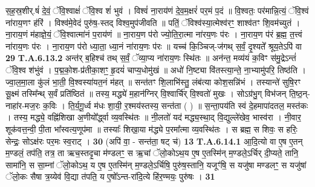 \documentclass[17pt]{extarticle}
\begin{document}
                  स॒ह॒स्र॒शीर्.षं॑ दे॒वं॒ ॅवि॒श्वाक्षं॑ ॅवि॒श्व शं॑ भुवं । विश्वं॑ ना॒राय॑णं दे॒व॒म॒क्षरं॑ पर॒मं प॒दं ॥  वि॒श्वतः॒ पर॑मान्नि॒त्यं॒ ॅवि॒श्वं ना॑राय॒णꣳ ह॑रिं । विश्व॑मे॒वेदं पुरु॑ष॒-स्तद् विश्व॒मुप॑जीवति ॥  पतिं॒ ॅविश्व॑स्या॒त्मेश्व॑रꣳ॒॒ शाश्व॑तꣳ शि॒वम॑च्युतं । ना॒राय॒णं म॑हाज्ञे॒यं॒ ॅवि॒श्वात्मा॑नं प॒राय॑णं ॥  ना॒राय॒ण प॑रो ज्यो॒ति॒रा॒त्मा ना॑रय॒णः प॑रः ।  ना॒राय॒ण प॑रं ब्र॒ह्म॒ त॒त्त्वं ना॑राय॒णः प॑रः । ना॒राय॒ण प॑रो ध्या॒ता॒ ध्या॒नं ना॑राय॒णः प॑रः ॥ यच्च॑ कि॒ञ्चिज्-ज॑गथ् स॒र्वं॒ दृ॒श्यते᳚ श्रूय॒तेऽपि॑ वा \textbf{ 29} \newline
                  \newline
                                                                  \textbf{ T.A.6.13.2} \newline
                  अन्त॑र् ब॒हिश्च॑ तथ् स॒र्वं॒ ॅव्या॒प्य ना॑राय॒णः स्थि॑तः ॥  अन॑न्त॒ मव्य॑यं क॒विꣳ स॑मु॒द्रेऽन्तं॑ ॅवि॒श्व श॑भुंवं । प॒द्म॒को॒श-प्र॑तीका॒शꣳ॒॒ हृ॒दयं॑ चाप्य॒धोमु॑खं ॥  अधो॑ नि॒ष्ट्या वि॑तस्त्या॒न्ते॒ ना॒भ्यामु॑परि॒ तिष्ठ॑ति ।  ज्वा॒ल॒मा॒ला कु॑लं भा॒ती॒ वि॒श्वस्या॑यत॒नं म॑हत् ॥  सन्त॑तꣳ शि॒लाभि॑स्तु॒ लंब॑त्या कोश॒सन्नि॑भं ।  तस्यान्ते॑ सुषि॒रꣳ सू॒क्ष्मं तस्मि᳚न्थ् स॒र्वं प्रति॑ष्ठितं ॥  तस्य॒ मद्ध्ये॑ म॒हान॑ग्निर् वि॒श्वार्चि॑र् वि॒श्वतो॑ मुखः । सोऽग्र॑भु॒ग् विभ॑जन् ति॒ष्ठ॒न्-नाहा॑र-मज॒रः क॒विः । ति॒र्य॒गू॒र्ध्व म॑धः शा॒यी॒ र॒श्मय॑स्तस्य॒ सन्त॑ता ( ) ॥ स॒न्ता॒पय॑ति स्वं दे॒हमापा॑दतल॒ मस्त॑कः । तस्य॒ मद्ध्ये॒ वह्नि॑शिखा अ॒णीयो᳚र्द्ध्वा व्य॒वस्थि॑तः ॥  नी॒लतो॑ यद॑ मद्ध्य॒स्था॒द् वि॒द्युल्ले॑खेव॒ भास्व॑रा ।  नी॒वार॒ शूक॑वत्त॒न्वी॒ पी॒ता भा᳚स्वत्य॒णूप॑मा ॥  तस्याः᳚ शिखा॒या म॑द्ध्ये प॒रमा᳚त्मा व्य॒वस्थि॑तः ।  स ब्रह्म॒ स शिवः॒ स हरिः॒ सेन्द्रः॒ सोऽक्ष॑रः पर॒मः स्व॒राट् । \textbf{ 30} \newline
                  \newline
                                                        (अपि॑ वा॒ - सन्त॑ता॒ षट् च॑) \textbf{13} \newline \newline
                                \textbf{ T.A.6.14.1} \newline
                  आ॒दि॒त्यो वा ए॒ष ए॒तन् म॒ण्डलं॒ तप॑ति॒ तत्र॒ ता ऋच॒स्तदृ॒चा म॑ण्डलꣳ॒॒ स ऋ॒चां ॅलो॒कोऽथ॒य ए॒ष ए॒तस्मि॑न् म॒ण्डले॒ऽर्चिर् दी॒प्यते॒ तानि॒ सामा॑नि॒ स सा॒म्नां ॅलो॒कोऽथ॒ य ए॒ष ए॒तस्मि॑न् म॒ण्डले॒ऽर्चिषि॒ पुरु॑ष॒स्तानि॒ यजूꣳ॑षि॒ स यजु॑षा मण्डलꣳ॒॒ स यजु॑षां ॅलो॒कः सैषा त्र॒य्येव॑ वि॒द्या त॑पति॒ य ए॒षो᳚ऽन्त-रा॑दि॒त्ये हि॑र॒ण्मयः॒ पुरु॑षः । \textbf{ 31} \newline
                  \newline
                                                         \textbf{} \newline \newline
\end{document}
